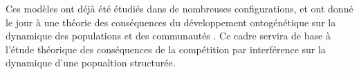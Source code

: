 Ces modèles ont déjà été étudiés dans de nombreuses configurations, et ont donné
le jour à une théorie des conséquences du développement ontogénétique sur la
dynamique des populations et des communautés \autocite{de-roos2012a}. Ce cadre
servira de base à l'étude théorique des conséquences de la compétition par
interférence sur la dynamique d'une popualtion structurée.
